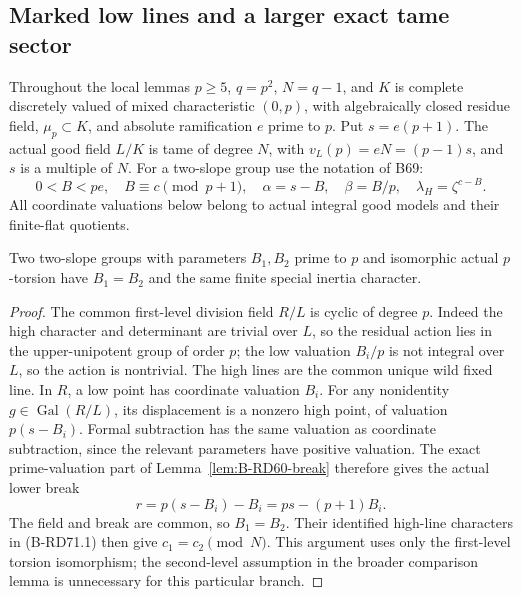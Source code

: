\subsection{Marked low lines and a larger exact tame sector}

Throughout the local lemmas \(p\ge5\), \(q=p^2\), \(N=q-1\),
and \(K\) is complete discretely valued of mixed characteristic
\((0,p)\), with algebraically closed residue field, \(\mu_p\subset K\),
and absolute ramification \(e\) prime to \(p\). Put \(s=e(p+1)\).
The actual good field \(L/K\) is tame of degree \(N\), with
\(v_L(p)=eN=(p-1)s\), and \(s\) is a multiple of \(N\).
For a two-slope group use the notation of B69:
\[
 0<B<pe,\quad B\equiv c\pmod{p+1},\quad
 \alpha=s-B,\quad\beta=B/p,\quad
 \lambda_H=\zeta^{c-B}.
 \tag{B-RD71.1}
\]
All coordinate valuations below belong to actual integral good
models and their finite-flat quotients.

\begin{lemma}
\label{lem:B-RD71-first-level}
Two two-slope groups with parameters \(B_1,B_2\) prime to \(p\)
and isomorphic actual \(p\)-torsion have \(B_1=B_2\) and the
same finite special inertia character.
\end{lemma}
\begin{proof}
The common first-level division field \(R/L\) is cyclic of
degree \(p\). Indeed the high character and determinant are
trivial over \(L\), so the residual action lies in the
upper-unipotent group of order \(p\); the low valuation \(B_i/p\)
is not integral over \(L\), so the action is nontrivial.
The high lines are the common unique wild fixed line.
In \(R\), a low point has coordinate valuation \(B_i\).
For any nonidentity \(g\in\operatorname{Gal}(R/L)\), its
displacement is a nonzero high point, of valuation
\(p(s-B_i)\). Formal subtraction has the same valuation as
coordinate subtraction, since the relevant parameters have
positive valuation.
The exact prime-valuation part of
Lemma~\ref{lem:B-RD60-break} therefore gives the actual lower break
\[
 r=p(s-B_i)-B_i=ps-(p+1)B_i.
 \tag{B-RD71.2}
\]
The field and break are common, so \(B_1=B_2\).
Their identified high-line characters in (B-RD71.1) then
give \(c_1=c_2\pmod N\). This argument uses only the first-level
torsion isomorphism; the second-level assumption in the broader
comparison lemma is unnecessary for this particular branch.
\end{proof}

